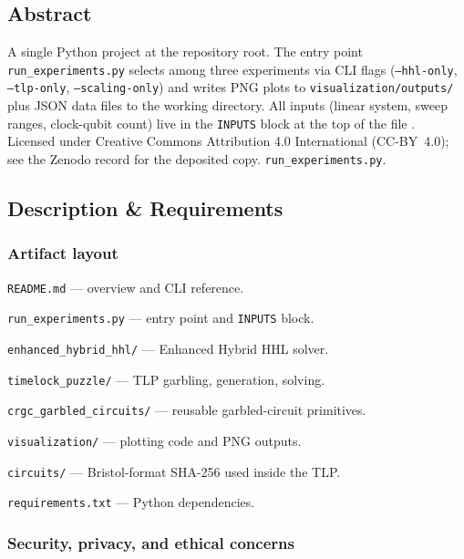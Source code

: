 \documentclass[nonacm,sigconf]{acmart}
\begin{document}
\subsection{Abstract}

A single Python project at the repository root.  The entry
point \texttt{run\_experiments.py} selects among three experiments
via CLI flags (\texttt{--hhl-only}, \texttt{--tlp-only},
\texttt{--scaling-only}) and writes PNG plots to
\texttt{visualization/outputs/} plus JSON data files to the working
directory.  All inputs (linear system, sweep ranges,
clock-qubit count) live in the \texttt{INPUTS} block at the top of the file
. Licensed under Creative Commons Attribution 4.0
International (CC-BY~4.0); see the Zenodo record for the
deposited copy. 
\texttt{run\_experiments.py}.

\subsection{Description \& Requirements}

\subsubsection*{Artifact layout}

\begin{compactitem}
\item \texttt{README.md} --- overview and CLI reference.
\item \texttt{run\_experiments.py} --- entry point and \texttt{INPUTS} block.
\item \texttt{enhanced\_hybrid\_hhl/} --- Enhanced Hybrid HHL solver.
\item \texttt{timelock\_puzzle/} --- TLP garbling, generation, solving.
\item \texttt{crgc\_garbled\_circuits/} --- reusable garbled-circuit primitives.
\item \texttt{visualization/} --- plotting code and PNG outputs.
\item \texttt{circuits/} --- Bristol-format SHA-256 used inside the TLP.
\item \texttt{requirements.txt} --- Python dependencies.
\end{compactitem}

\subsubsection{Security, privacy, and ethical concerns}
\end{document}
